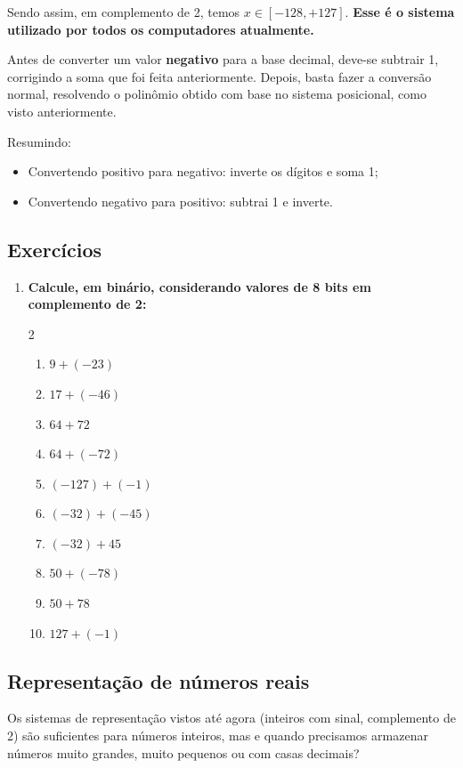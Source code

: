 \documentclass[12pt]{article}
\begin{document}
\noindent
Sendo assim, em complemento de 2, temos  $x \in [-128, +127]$.
\textbf{Esse é o sistema utilizado por todos os computadores atualmente.}

\begin{tcolorbox}[mynote, title= Observação]
Antes de converter um valor \textbf{negativo} para a base decimal, deve-se subtrair 1, corrigindo a soma que foi feita anteriormente. Depois, basta fazer a conversão normal, resolvendo o polinômio obtido com base no sistema posicional, como visto anteriormente.
\end{tcolorbox}

\noindent
\vspace{0.1cm}
Resumindo:

\begin{itemize}
    \item Convertendo positivo para negativo: inverte os dígitos e soma 1;
    \item Convertendo negativo para positivo: subtrai 1 e inverte.
\end{itemize}

\subsection{Exercícios}
\begin{enumerate}
\item \textbf{Calcule, em binário, considerando valores de 8 bits em complemento de 2:}
\begin{multicols}{2}
    \begin{enumerate}
        \item $9 + (-23)$
        \item $17 + (-46)$
        \item $64 + 72$
        \item $64 + (-72)$
        \item $(-127) + (-1)$
        \columnbreak
        \item $(-32) + (-45)$
        \item $(-32) + 45$
        \item $50 + (-78)$
        \item $50 + 78$
        \item $127 + (-1)$
    \end{enumerate}
\end{multicols}
\end{enumerate}

\newpage
\subsection{Representação de números reais}
Os sistemas de representação vistos até agora (inteiros com sinal, complemento de 2) são suficientes para números inteiros, mas e quando precisamos armazenar números muito grandes, muito pequenos ou com casas decimais?
\end{document}
